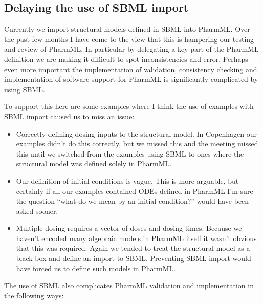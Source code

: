 \documentclass[a4paper,11pt]{article}
\newcommand{\pharmml}{PharmML\xspace}
\begin{document}
\subsection{Delaying the use of SBML import}

Currently we import structural models defined in SBML into
\pharmml. Over the past few months I have come to the view that this
is hampering our testing and review of \pharmml. In particular by
delegating a key part of the \pharmml definition we are making it
difficult to spot inconsistencies and error. Perhaps even more
important the implementation of validation, consistency checking and
implementation of software support for \pharmml is significantly
complicated by using SBML.

To support this here are some examples where I think the use of
examples with SBML import caused us to miss an issue:

\begin{itemize}
\item Correctly defining dosing inputs to the structural model. In
  Copenhagen our examples didn't do this correctly, but we missed this
  and the meeting missed this until we switched from the examples
  using SBML to ones where the structural model was defined solely in
  \pharmml.
\item Our definition of initial conditions is vague. This is more
  arguable, but certainly if all our examples contained ODEs defined
  in \pharmml I'm sure the question ``what do we mean by an initial
  condition?'' would have been asked sooner.
\item Multiple dosing requires a vector of doses and dosing
  times. Because we haven't encoded many algebraic models in \pharmml
  itself it wasn't obvious that this was required. Again we tended to
  treat the structural model as a black box and define an import to
  SBML. Preventing SBML import would have forced us to define such
  models in \pharmml.
\end{itemize}

The use of SBML also complicates \pharmml validation and
implementation in the following ways:
\end{document}
